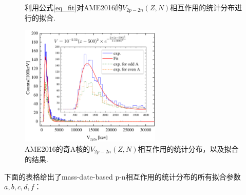 \begin{figure}[H]
\centering
{}
\qquad
{}
\caption{利用公式\ref{eq_fit}对AME2016的$V_{2p-2n}(Z,N)$相互作用的统计分布进行的拟合.\label{fig_YE3FitV2p2n_1}}
\end{figure}
\begin{figure}[H]
\centering
\includegraphics[width=0.6\textwidth]{figure/YE3fiteV2p2n100.pdf}
\caption{AME2016的奇A核的$V_{2p-2n}(Z,N)$相互作用的统计分布，以及拟合的结果.\label{fig_YE3fiteV2p2n100}}
\end{figure}
下面的表格给出了mass-date-based p-n相互作用的统计分布的所有拟合参数$a, b,c,d,f$：

